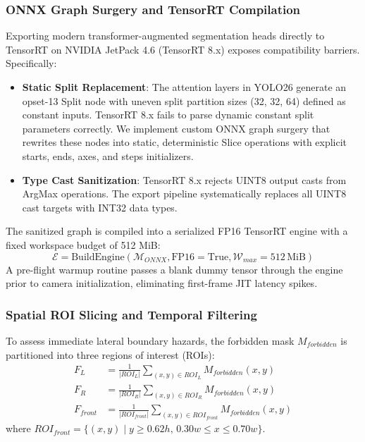 \documentclass[conference]{IEEEtran}
\begin{document}
\subsubsection{ONNX Graph Surgery and TensorRT Compilation}
Exporting modern transformer-augmented segmentation heads directly to TensorRT on NVIDIA JetPack 4.6 (TensorRT 8.x) exposes compatibility barriers. Specifically:
\begin{itemize}
    \item \textbf{Static Split Replacement}: The attention layers in YOLO26 generate an opset-13 Split node with uneven split partition sizes (32, 32, 64) defined as constant inputs. TensorRT 8.x fails to parse dynamic constant split parameters correctly. We implement custom ONNX graph surgery that rewrites these nodes into static, deterministic Slice operations with explicit starts, ends, axes, and steps initializers.
    \item \textbf{Type Cast Sanitization}: TensorRT 8.x rejects UINT8 output casts from ArgMax operations. The export pipeline systematically replaces all UINT8 cast targets with INT32 data types.
\end{itemize}
The sanitized graph is compiled into a serialized FP16 TensorRT engine with a fixed workspace budget of 512 MiB:
\begin{equation}
    \mathcal{E} = \text{BuildEngine}(\mathcal{M}_{ONNX}, \text{FP16}=\text{True}, \mathcal{W}_{max}=512\,\text{MiB})
\end{equation}
A pre-flight warmup routine passes a blank dummy tensor through the engine prior to camera initialization, eliminating first-frame JIT latency spikes.

\subsubsection{Spatial ROI Slicing and Temporal Filtering}
To assess immediate lateral boundary hazards, the forbidden mask $M_{forbidden}$ is partitioned into three regions of interest (ROIs):
\begin{align}
    F_L       & = \frac{1}{|ROI_L|} \sum_{(x,y) \in ROI_L} M_{forbidden}(x,y)             \\
    F_R       & = \frac{1}{|ROI_R|} \sum_{(x,y) \in ROI_R} M_{forbidden}(x,y)             \\
    F_{front} & = \frac{1}{|ROI_{front}|} \sum_{(x,y) \in ROI_{front}} M_{forbidden}(x,y)
\end{align}
where $ROI_{front} = \{(x,y) \mid y \ge 0.62 h,\, 0.30 w \le x \le 0.70 w\}$.
\end{document}
